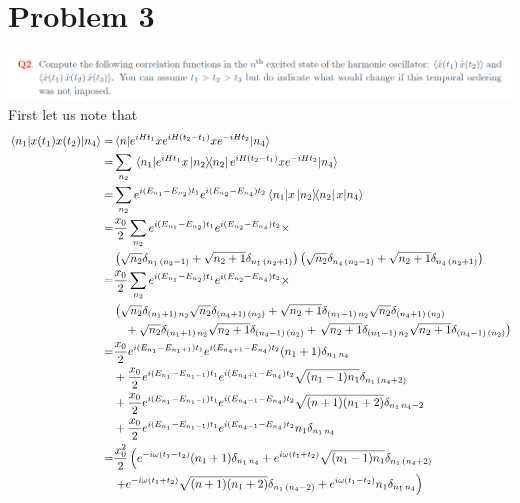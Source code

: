 \documentclass[a4paper,11pt]{article}
\begin{document}
\section*{Problem 3}
\hspace*{-1cm}\includegraphics[width=0.85\pagewidth]{2.png}
First let us note that
\begin{equation}
	\begin{aligned}
		\mel{n_1}{x(t_1)x(t_2)}{n_4}=&\mel{n}{e^{iHt_1}xe^{iH(t_2-t_1)}xe^{-iHt_2}}{n_4}\\
		=&\sum_{n_2}\mel{n_1}{e^{iHt_1}x\dyad{n_2}{n_2}e^{iH(t_2-t_1)}xe^{-iHt_2}}{n_4}
		\\
		=&\sum_{n_2} e^{i(E_{n_1}-E_{n_2})t_1}e^{i(E_{n_2}-E_{n_4})t_2}\mel{n_1}{x\dyad{n_2}{n_2}x}{n_4}
		\\
		=&\frac{x_0}{2}\sum_{n_2} e^{i(E_{n_1}-E_{n_2})t_1}e^{i(E_{n_2}-E_{n_4})t_2}\times \\
		&\left(\sqrt{n_2}\delta_{n_1\,(n_2-1)}+\sqrt{n_2+1}\delta_{n_1\,(n_2+1)}\right)\left(\sqrt{n_2}\delta_{n_4\,(n_2-1)}+\sqrt{n_2+1}\delta_{n_4\,(n_2+1)}\right)
		\\
		=&\frac{x_0}{2}\sum_{n_2} e^{i(E_{n_1}-E_{n_2})t_1}e^{i(E_{n_2}-E_{n_4})t_2}\times \\
		&\left(\sqrt{n_2}\delta_{(n_1+1)\,n_2}\sqrt{n_2}\delta_{(n_4+1)\,(n_2)}+\sqrt{n_2+1}\delta_{(n_1-1)\,n_2}\sqrt{n_2}\delta_{(n_4+1)\,(n_2)}\right.\\
		&\quad+\sqrt{n_2}\delta_{(n_1+1)\,n_2}\sqrt{n_2+1}\delta_{(n_4-1)\,(n_2)}+\left.\sqrt{n_2+1}\delta_{(n_1-1)\,n_2}\sqrt{n_2+1}\delta_{(n_4-1)\,(n_2)}\right)
		\\
	=&\frac{x_0}{2} e^{i(E_{n_1}-E_{n_1+1})t_1}e^{i(E_{n_4+1}-E_{n_4})t_2}(n_1+1)\delta_{n_1\,n_4}\\
	&+\frac{x_0}{2} e^{i(E_{n_1}-E_{n_1-1})t_1}e^{i(E_{n_4+1}-E_{n_4})t_2}\sqrt{(n_1-1)n_1}\delta_{n_1\,(n_4+2)}\\
	&+\frac{x_0}{2} e^{i(E_{n_1}-E_{n_1-1})t_1}e^{i(E_{n_4-1}-E_{n_4})t_2} \sqrt{(n+1)(n_1+2)}\delta_{n_1\,n_4-2}\\
	&+\frac{x_0}{2} e^{i(E_{n_1}-E_{n_1-1})t_1}e^{i(E_{n_4-1}-E_{n_4})t_2}n_1\delta_{n_1\,n_4}
		\\
=&\frac{x_0^2}{2}\left( e^{-i\omega (t_1-t_2)}(n_1+1)\delta_{n_1\,n_4}+ e^{i \omega (t_1+t_2)}\sqrt{(n_1-1)n_1}\delta_{n_1\,(n_4+2)}\right.\\
&\left.+ e^{-i\omega (t_1+t_2)}\sqrt{(n+1)(n_1+2)}\delta_{n_1\,(n_4-2)}+ e^{i\omega (t_1-t_2)}n_1\delta_{n_1\,n_4}\right)\\
	\end{aligned}
\end{equation}
\end{document}
